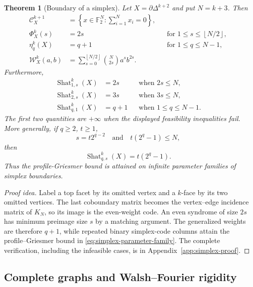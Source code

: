 \documentclass[11pt,letterpaper]{article}
\theoremstyle{plain}
\newtheorem{theorem}{Theorem}[section]
\theoremstyle{definition}
\newcommand{\F}{\mathbb{F}_2}
\newcommand{\cC}{\mathcal{C}}
\newcommand{\cW}{\mathcal{W}}
\newcommand{\Shat}{\operatorname{Shat}}
\newcommand{\1}{\mathbf{1}}
\newcommand{\set}[1]{\left\{#1\right\}}
\newcommand{\floor}[1]{\left\lfloor#1\right\rfloor}
\begin{document}
\begin{theorem}[Boundary of a simplex]\label{thm:simplex-boundary}
Let $X=\partial\Delta^{k+2}$ and put $N=k+3$.  Then
\begin{align}
 \cC_X^{k+1}
 &=\set{x\in\F^N:\sum_{i=1}^N x_i=0},
 \label{eq:even-code}\\
 \Phi_X^k(s)&=2s
 &&\text{for }1\le s\le\floor{N/2},
 \label{eq:simplex-profile}\\
 \eta_q^k(X)&=q+1
 &&\text{for }1\le q\le N-1,
 \label{eq:simplex-eta}\\
 \cW_X^k(a,b)
 &=\sum_{s=0}^{\floor{N/2}}\binom{N}{2s}a^sb^{2s}.
 \label{eq:simplex-W}
\end{align}
Furthermore,
\begin{align}
 \Shat_{1,s}^k(X)&=2s
 &&\text{when }2s\le N,
 \label{eq:simplex-q1}\\
 \Shat_{2,s}^k(X)&=3s
 &&\text{when }3s\le N,
 \label{eq:simplex-q2}\\
 \Shat_{q,1}^k(X)&=q+1
 &&\text{when }1\le q\le N-1.
 \label{eq:simplex-sharp}
\end{align}
The first two quantities are $+\infty$ when the displayed feasibility inequalities
fail.  More generally, if $q\ge2$, $t\ge1$,
\begin{equation}\label{eq:simplex-parameter-family}
 s=t2^{q-2}
 \quad\text{and}\quad
 t(2^q-1)\le N,
\end{equation}
then
\begin{equation}\label{eq:simplex-general-sharp}
 \Shat_{q,s}^k(X)=t(2^q-1).
\end{equation}
Thus the profile-Griesmer bound is attained on infinite parameter families of simplex
boundaries.
\end{theorem}

\begin{proof}[Proof idea]
Label a top facet by its omitted vertex and a $k$-face by its two omitted vertices.  The
last coboundary matrix becomes the vertex--edge incidence matrix of $K_N$, so its image
is the even-weight code.  An even syndrome of size $2s$ has minimum preimage size $s$
by a matching argument.  The generalized weights are therefore $q+1$, while repeated
binary simplex-code columns attain the profile--Griesmer bound in
\eqref{eq:simplex-parameter-family}.  The complete verification, including the
infeasible cases, is in Appendix~\ref{app:simplex-proof}.
\end{proof}


\subsection{Complete graphs and Walsh--Fourier rigidity}
\end{document}
